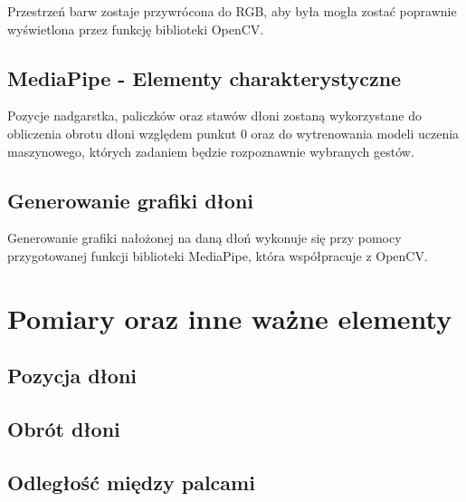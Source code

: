 \quad Przestrzeń barw zostaje przywrócona do RGB, aby była mogła zostać poprawnie wyświetlona przez funkcję biblioteki OpenCV. 





\subsection{MediaPipe - Elementy charakterystyczne}

\quad Pozycje nadgarstka, paliczków oraz stawów dłoni zostaną wykorzystane do obliczenia obrotu dłoni względem punkut 0 oraz do wytrenowania modeli uczenia maszynowego, których zadaniem będzie rozpoznawnie wybranych gestów. 

\subsection{Generowanie grafiki dłoni}

\quad Generowanie grafiki nałożonej na daną dłoń wykonuje się przy pomocy przygotowanej funkcji biblioteki MediaPipe, która współpracuje z OpenCV.   

\section{Pomiary oraz inne ważne elementy}

\subsection{Pozycja dłoni}

\subsection{Obrót dłoni}

\subsection{Odległość między palcami}




